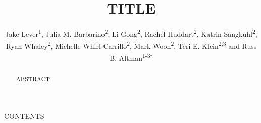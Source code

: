 \documentclass{ws-procs11x85}
\begin{document}
\title{TITLE}


\author{Jake Lever\textsuperscript{1}, Julia M. Barbarino\textsuperscript{2}, Li Gong\textsuperscript{2}, Rachel Huddart\textsuperscript{2}, Katrin Sangkuhl\textsuperscript{2}, Ryan Whaley\textsuperscript{2}, Michelle Whirl-Carrillo\textsuperscript{2}, Mark Woon\textsuperscript{2}, Teri E. Klein\textsuperscript{2,3} and Russ B. Altman\textsuperscript{1-3}$^\dag$}

\address{
\textsuperscript{1}Department of Bioengineering, Stanford University, Stanford, CA, 94305 \\
\textsuperscript{2}Department of Biomedical Data Science, Stanford University, Stanford, CA, 94305 \\
\textsuperscript{3}Department of Medicine, Stanford University, Stanford, CA, 94305 \\
$^\dag$E-mail: rbaltman@stanford.edu\\
}


\begin{abstract}
ABSTRACT
\end{abstract}




CONTENTS




\end{document}
